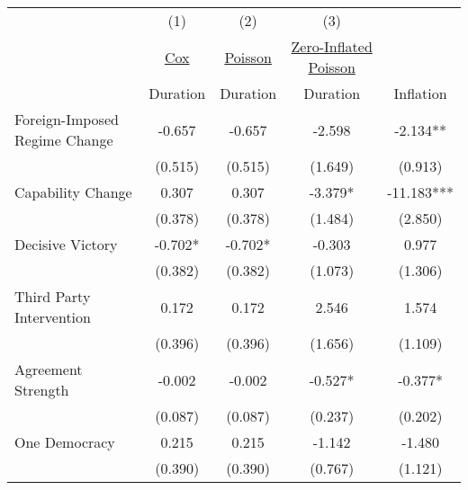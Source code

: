 {
\def\sym#1{\ifmmode^{#1}\else\(^{#1}\)\fi}
\begin{tabular}{l*{4}{c}}
\toprule
                                                            &\multicolumn{1}{c}{(1)}   &\multicolumn{1}{c}{(2)}   &\multicolumn{1}{c}{(3)}   &               \\
                                                            &\underline{Cox}   &\underline{Poisson}   &\underline{Zero-Inflated Poisson}   &               \\
                                                            &    Duration   &    Duration   &    Duration   &   Inflation   \\
\midrule
Foreign-Imposed Regime Change                               &      -0.657   &      -0.657   &      -2.598   &      -2.134** \\
                                                            &     (0.515)   &     (0.515)   &     (1.649)   &     (0.913)   \\
Capability Change                                           &       0.307   &       0.307   &      -3.379*  &     -11.183***\\
                                                            &     (0.378)   &     (0.378)   &     (1.484)   &     (2.850)   \\
Decisive Victory                                            &      -0.702*  &      -0.702*  &      -0.303   &       0.977   \\
                                                            &     (0.382)   &     (0.382)   &     (1.073)   &     (1.306)   \\
Third Party Intervention                                    &       0.172   &       0.172   &       2.546   &       1.574   \\
                                                            &     (0.396)   &     (0.396)   &     (1.656)   &     (1.109)   \\
Agreement Strength                                          &      -0.002   &      -0.002   &      -0.527*  &      -0.377*  \\
                                                            &     (0.087)   &     (0.087)   &     (0.237)   &     (0.202)   \\
One Democracy                                               &       0.215   &       0.215   &      -1.142   &      -1.480   \\
                                                            &     (0.390)   &     (0.390)   &     (0.767)   &     (1.121)   \\

\end{tabular}}
